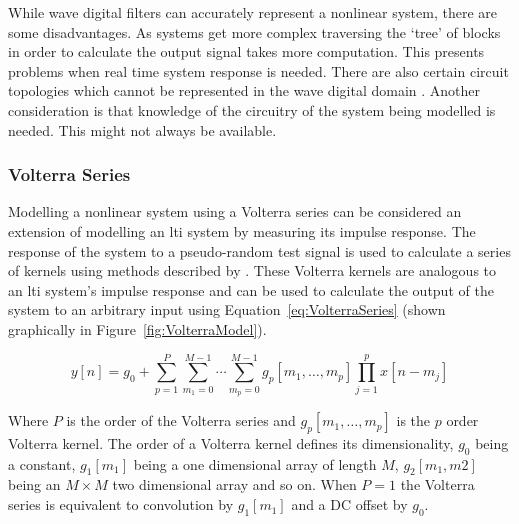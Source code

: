 			While wave digital filters can accurately represent a nonlinear system, there are some
			disadvantages. As systems get more complex traversing the `tree' of blocks in order to calculate
			the output signal takes more computation. This presents problems when real time system response is
			needed. There are also certain circuit topologies which cannot be represented in the wave digital
			domain \citep{valimaki2011virtual}. Another consideration is that knowledge of the circuitry of the
			system being modelled is needed. This might not always be available.

		\subsubsection{Volterra Series}
			Modelling a nonlinear system using a Volterra series can be considered an extension of modelling an
			\acrshort{lti} system by measuring its impulse response. The response of the system to a
			pseudo-random test signal is used to calculate a series of kernels using methods described by
			\citet{schetzen1980the}.  These Volterra kernels are analogous to an \acrshort{lti} system's
			impulse response and can be used to calculate the output of the system to an arbitrary input using
			Equation~\ref{eq:VolterraSeries} (shown graphically in Figure~\ref{fig:VolterraModel}).

			\begin{equation}
				y[n] = g_{0} + \sum_{p = 1}^{P} 
					\sum_{m_{1} = 0}^{M - 1} \dotsi \sum_{m_{p} = 0}^{M - 1}
					g_{p}[m_{1}, \dotsc , m_{p}]
					\prod_{j = 1}^{p} x[n - m_{j}]
				\label{eq:VolterraSeries}
			\end{equation}

			Where $P$ is the order of the Volterra series and $g_{p}[m_{1}, \dotsc , m_{p}]$ is the
			$p$ order Volterra kernel. The order of a Volterra kernel defines its dimensionality,
			$g_{0}$ being a constant, $g_{1}[m_{1}]$ being a one dimensional array of length $M$, $g_{2}[m_{1},
			m{2}]$ being an $M \times M$ two dimensional array and so on. When $P = 1$ the Volterra series is
			equivalent to convolution by $g_{1}[m_{1}]$ and a DC offset by $g_{0}$.

